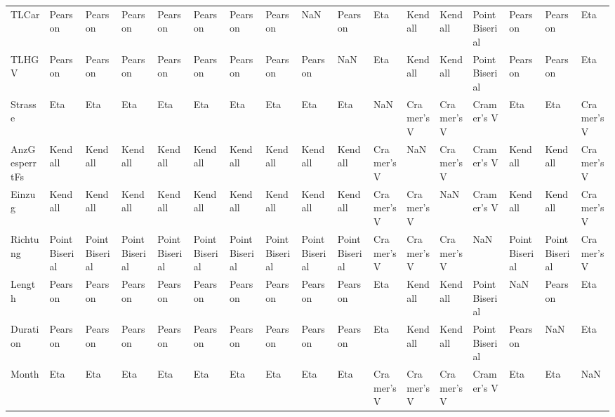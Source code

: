 \begin{tabular}{lllllllllllllllll}
TLCar         &         Pearson &         Pearson &         Pearson &         Pearson &         Pearson &         Pearson &         Pearson &             NaN &         Pearson &         Eta &       Kendall &     Kendall &  Point Biserial &         Pearson &         Pearson &         Eta \\
TLHGV         &         Pearson &         Pearson &         Pearson &         Pearson &         Pearson &         Pearson &         Pearson &         Pearson &             NaN &         Eta &       Kendall &     Kendall &  Point Biserial &         Pearson &         Pearson &         Eta \\
Strasse       &             Eta &             Eta &             Eta &             Eta &             Eta &             Eta &             Eta &             Eta &             Eta &         NaN &    Cramer's V &  Cramer's V &      Cramer's V &             Eta &             Eta &  Cramer's V \\
AnzGesperrtFs &         Kendall &         Kendall &         Kendall &         Kendall &         Kendall &         Kendall &         Kendall &         Kendall &         Kendall &  Cramer's V &           NaN &  Cramer's V &      Cramer's V &         Kendall &         Kendall &  Cramer's V \\
Einzug        &         Kendall &         Kendall &         Kendall &         Kendall &         Kendall &         Kendall &         Kendall &         Kendall &         Kendall &  Cramer's V &    Cramer's V &         NaN &      Cramer's V &         Kendall &         Kendall &  Cramer's V \\
Richtung      &  Point Biserial &  Point Biserial &  Point Biserial &  Point Biserial &  Point Biserial &  Point Biserial &  Point Biserial &  Point Biserial &  Point Biserial &  Cramer's V &    Cramer's V &  Cramer's V &             NaN &  Point Biserial &  Point Biserial &  Cramer's V \\
Length        &         Pearson &         Pearson &         Pearson &         Pearson &         Pearson &         Pearson &         Pearson &         Pearson &         Pearson &         Eta &       Kendall &     Kendall &  Point Biserial &             NaN &         Pearson &         Eta \\
Duration      &         Pearson &         Pearson &         Pearson &         Pearson &         Pearson &         Pearson &         Pearson &         Pearson &         Pearson &         Eta &       Kendall &     Kendall &  Point Biserial &         Pearson &             NaN &         Eta \\
Month         &             Eta &             Eta &             Eta &             Eta &             Eta &             Eta &             Eta &             Eta &             Eta &  Cramer's V &    Cramer's V &  Cramer's V &      Cramer's V &             Eta &             Eta &         NaN \\
\bottomrule
\end{tabular}
